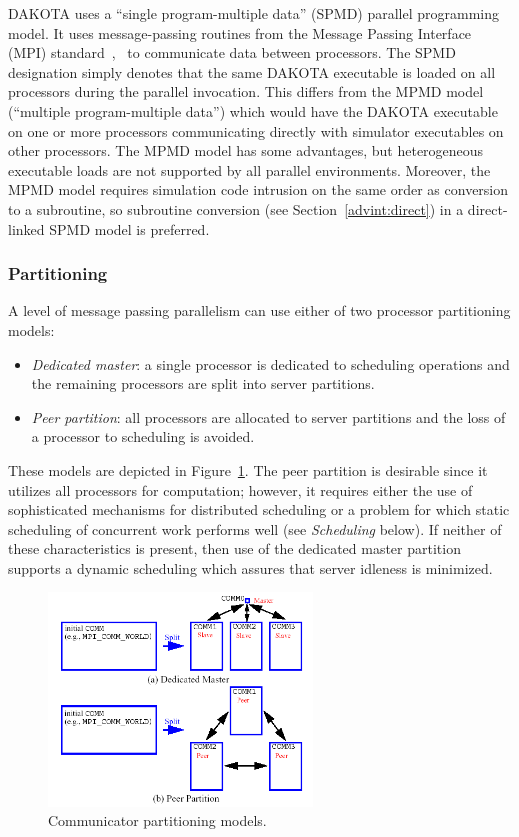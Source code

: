 DAKOTA uses a ``single program-multiple data'' (SPMD) parallel
programming model. It uses message-passing routines from the Message
Passing Interface (MPI) standard~\cite{Gro94},~\cite{Sni96} to
communicate data between processors. The SPMD designation simply
denotes that the same DAKOTA executable is loaded on all processors
during the parallel invocation. This differs from the MPMD model
(``multiple program-multiple data'') which would have the DAKOTA
executable on one or more processors communicating directly with
simulator executables on other processors. The MPMD model has some
advantages, but heterogeneous executable loads are not supported by
all parallel environments. Moreover, the MPMD model requires
simulation code intrusion on the same order as conversion to a
subroutine, so subroutine conversion (see Section~\ref{advint:direct})
in a direct-linked SPMD model is preferred.

\subsubsection{Partitioning}\label{parallel:SLP:message:part}

A level of message passing parallelism can use either of two processor
partitioning models:
\begin{itemize}
\item \emph{Dedicated master}: a single processor is dedicated to
scheduling operations and the remaining processors are split into
server partitions.

\item \emph{Peer partition}: all processors are allocated to server
partitions and the loss of a processor to scheduling is avoided.
\end{itemize}
These models are depicted in Figure~\ref{parallel:figure01}. The peer
partition is desirable since it utilizes all processors for
computation; however, it requires either the use of sophisticated
mechanisms for distributed scheduling or a problem for which static
scheduling of concurrent work performs well (see \emph{Scheduling}
below).  If neither of these characteristics is present, then use of
the dedicated master partition supports a dynamic scheduling which
assures that server idleness is minimized.

\begin{figure}[ht]
  \centering
  \includegraphics[width=70mm]{images/comm_partitioning}
  \caption{Communicator partitioning models.}
  \label{parallel:figure01}
\end{figure}

